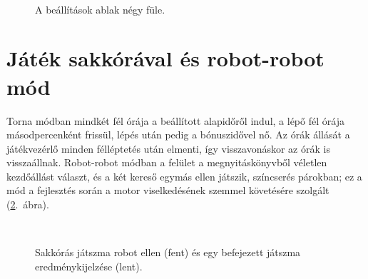 \begin{figure}[H]
	\centering
	\hspace{4mm}
	\\[4mm]
	\hspace{4mm}
	\caption{A beállítások ablak négy füle.}
	\label{fig:guiSettings}
\end{figure}

\section{Játék sakkórával és robot-robot mód}

Torna módban mindkét fél órája a beállított alapidőről indul, a lépő fél órája másodpercenként frissül, lépés után pedig a bónuszidővel nő. Az órák állását a játékvezérlő minden félléptetés után elmenti, így visszavonáskor az órák is visszaállnak. Robot-robot módban a felület a megnyitáskönyvből véletlen kezdőállást választ, és a két kereső egymás ellen játszik, színcserés párokban; ez a mód a fejlesztés során a motor viselkedésének szemmel követésére szolgált (\ref{fig:guiClock}.~ábra).

\begin{figure}[H]
	\centering
	\\[4mm]
	\caption{Sakkórás játszma robot ellen (fent) és egy befejezett játszma eredménykijelzése (lent).}
	\label{fig:guiClock}
\end{figure}
